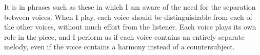 It is in phrases such as these in which I am aware of the need for the separation between voices. When I play, each voice should be distinguishable from each of the other voices, without much effort from the listener. Each voice plays its own role in the piece, and I perform as if each voice contains an entirely separate melody, even if the voice contains a harmony instead of a countersubject. 

